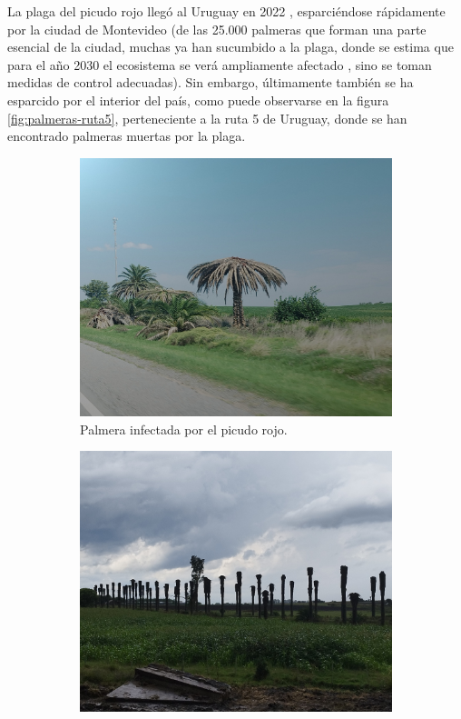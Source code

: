 La plaga del picudo rojo llegó al Uruguay en 2022 \citep{mgap_informacion_nodate}, esparciéndose rápidamente por la ciudad de Montevideo (de las 25.000 palmeras que forman una parte esencial de la ciudad, muchas ya han sucumbido a la plaga, donde se estima que para el año 2030 el ecosistema se verá ampliamente afectado \citep{arcos_picudo_2024}, sino se toman medidas de control adecuadas). Sin embargo, últimamente también se ha esparcido por el interior del país, como puede observarse en la figura \ref{fig:palmeras-ruta5}, perteneciente a la ruta 5 de Uruguay, donde se han encontrado palmeras muertas por la plaga.

\begin{figure}[htpb]
  \centering
  \begin{subfigure}[b]{0.49\textwidth}
    \centering
    \includegraphics[width=\textwidth]{./Figures/palmera-infectada.jpg}
    \caption{Palmera infectada por el picudo rojo.}
    \label{fig:palmera-infectada}
  \end{subfigure}
  \hfill
  \begin{subfigure}[b]{0.49\textwidth}
    \centering
    \includegraphics[width=.99\textwidth]{./Figures/palmeras-ruta5.jpg}

\end{subfigure}
\end{figure}
